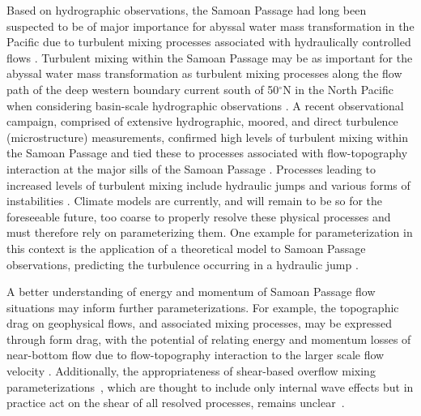 \documentclass{ametsocV6.1}
\begin{document}
Based on hydrographic observations, the Samoan Passage had long been suspected to be of major importance for abyssal water mass transformation in the Pacific \citep{roemmichetal96} due to turbulent mixing processes associated with hydraulically controlled flows \citep{whitehead98, freeland01}.
Turbulent mixing within the Samoan Passage may be as important for the abyssal water mass transformation as turbulent mixing processes along the flow path of the deep western boundary current south of 50$^\circ$N in the North Pacific when considering basin-scale hydrographic observations \citep{prattetal19}.
A recent observational campaign, comprised of extensive hydrographic, moored, and direct turbulence (microstructure) measurements, confirmed high levels of turbulent mixing within the Samoan Passage \citep{alfordetal13c, carteretal19} and tied these to processes associated with flow-topography interaction at the major sills of the Samoan Passage \citep{voetetal15,girtonetal19}.
Processes leading to increased levels of turbulent mixing include hydraulic jumps and various forms of instabilities \citep{cusacketal21}.
Climate models are currently, and will remain to be so for the foreseeable future, too coarse to properly resolve these physical processes and must therefore rely on parameterizing them.
One example for parameterization in this context is the application of a theoretical model \citep{thorpeli14} to Samoan Passage observations, predicting the turbulence occurring in a hydraulic jump \citep{thorpeetal18}.

A better understanding of energy and momentum of Samoan Passage flow situations may inform further parameterizations.
For example, the topographic drag on geophysical flows, and associated mixing processes, may be expressed through form drag, with the potential of relating energy and momentum losses of near-bottom flow due to flow-topography interaction to the larger scale flow velocity \citep[e.g.][]{warnermaccready09}.
Additionally, the appropriateness of shear-based overflow mixing parameterizations~\citep[e.g.][]{legg21}, which are thought to include only internal wave effects but in practice act on the shear of all resolved processes, remains unclear~\citep{alfordetal13c}.
\end{document}
